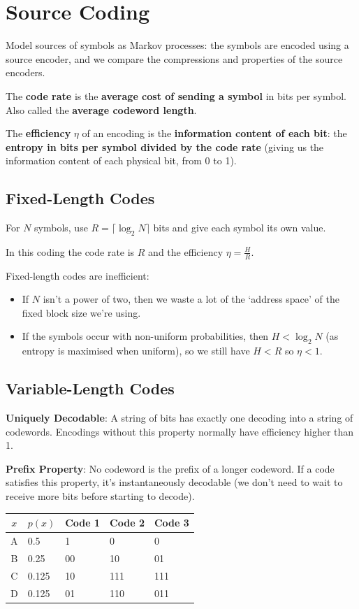 \documentclass[a4paper, 11pt]{article}
\begin{document}
\section*{Source Coding}
{
    Model sources of symbols as Markov processes: the symbols are encoded using a source encoder, and we compare the compressions and properties of the source encoders.

    The \textbf{code rate} is the \textbf{average cost of sending a symbol} in bits per symbol. Also called the \textbf{average codeword length}.

    The \textbf{efficiency} \(\eta\) of an encoding is the \textbf{information content of each bit}: the \textbf{entropy in bits per symbol divided by the code rate} (giving us the information content of each physical bit, from 0 to 1).

    \subsection*{Fixed-Length Codes}
    {
        For \(N\) symbols, use \(R = \lceil \log_2{N} \rceil\) bits and give each symbol its own value.

        In this coding the code rate is \(R\) and the efficiency \(\eta = \frac{H}{R}\).

        Fixed-length codes are inefficient:
        \begin{itemize}
        \item If \(N\) isn't a power of two, then we waste a lot of the `address space' of the fixed block size we're using.
        \item If the symbols occur with non-uniform probabilities, then \(H < \log_2{N}\) (as entropy is maximised when uniform), so we still have \(H < R\) so \(\eta < 1\).
        \end{itemize}
    }
    \subsection*{Variable-Length Codes}
    {
        \textbf{Uniquely Decodable}: A string of bits has exactly one decoding into a string of codewords. Encodings without this property normally have efficiency higher than 1.

        \textbf{Prefix Property}: No codeword is the prefix of a longer codeword. If a code satisfies this property, it's instantaneously decodable (we don't need to wait to receive more bits before starting to decode).

        \begin{tabular}{c | l | l | l | l}
        \(x\) & \(p(x)\) & Code 1 & Code 2 & Code 3 \\
        \hline
        A & 0.5 & 1 & 0 & 0 \\
        B & 0.25 & 00 & 10 & 01 \\
        C & 0.125 & 10 & 111 & 111 \\
        D & 0.125 & 01 & 110 & 011 \\
        \end{tabular}

}}
\end{document}
